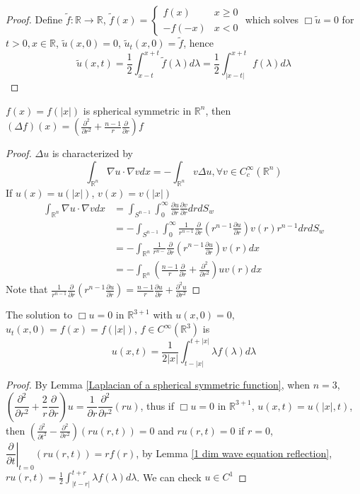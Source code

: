 \documentclass[main]{subfiles}
\begin{document}
\begin{proof}
Define $\tilde f:\mathbb R\to\mathbb R$, $\tilde f(x)=\begin{cases}
f(x)&x\geq0 \\
-f(-x) &x<0
\end{cases}$ which solves $\Box\tilde u=0$ for $t>0,x\in\mathbb R$, $\tilde u(x,0)=0$, $\tilde u_t(x,0)=\tilde f$, hence
\[\tilde u(x,t)=\frac{1}{2}\int_{x-t}^{x+t}\tilde f(\lambda)d\lambda=\frac{1}{2}\int_{|x-t|}^{x+t}f(\lambda)d\lambda\]
\end{proof}

\begin{lemma}\label{Laplacian of a spherical symmetric function}
$f(x)=f(|x|)$ is spherical symmetric in $\mathbb R^n$, then $\displaystyle(\Delta f)(x)=\left(\frac{\partial^2}{\partial r^2}+\frac{n-1}{r}\frac{\partial}{\partial r}\right)f$
\end{lemma}

\begin{proof}
$\Delta u$ is characterized by
\[\int_{\mathbb R^n}\nabla u\cdot\nabla vdx=-\int_{\mathbb R^n}v\Delta u, \forall v\in C^\infty_c(\mathbb R^n)\]
If $u(x)=u(|x|)$, $v(x)=v(|x|)$
\begin{align*}
\int_{\mathbb R^n}\nabla u\cdot\nabla vdx&=\int_{S^{n-1}}\int_0^\infty\frac{\partial u}{\partial r}\frac{\partial v}{\partial r}drdS_w \\
&=-\int_{S^{n-1}}\int_0^\infty\frac{1}{r^{n-1}}\frac{\partial}{\partial r}\left(r^{n-1}\frac{\partial u}{\partial r}\right)v(r)r^{n-1}drdS_w \\
&=-\int_{\mathbb R^n}\frac{1}{r^{n-}}\frac{\partial}{\partial r}\left(r^{n-1}\frac{\partial u}{\partial r}\right)v(r)dx \\
&=-\int_{\mathbb R^n}\left(\frac{n-1}{r}\frac{\partial }{\partial r}+\frac{\partial^2}{\partial r^2}\right)uv(r)dx
\end{align*}
Note that $\displaystyle\frac{1}{r^{n-1}}\frac{\partial}{\partial r}\left(r^{n-1}\frac{\partial u}{\partial r}\right)=\frac{n-1}{r}\frac{\partial u}{\partial r}+\frac{\partial^2u}{\partial r^2}$
\end{proof}

\begin{theorem}
The solution to $\Box u=0$ in $\mathbb R^{3+1}$ with $u(x,0)=0$, $u_t(x,0)=f(x)=f(|x|)$, $f\in C^\infty(\mathbb R^3)$ is
\[u(x,t)=\frac{1}{2|x|}\int_{t-|x|}^{t+|x|}\lambda f(\lambda)d\lambda\]
\end{theorem}

\begin{proof}
By Lemma \ref{Laplacian of a spherical symmetric function}, when $n=3$, $\left(\dfrac{\partial^2}{\partial r^2}+\dfrac{2}{r}\dfrac{\partial}{\partial r}\right)u=\dfrac{1}{\partial r}\dfrac{\partial^2}{\partial r^2}(ru)$, thus if $\Box u=0$ in $\mathbb R^{3+1}$, $u(x,t)=u(|x|,t)$, then $\displaystyle\left(\frac{\partial^2}{\partial t^2}-\frac{\partial^2}{\partial r^2}\right)(ru(r,t))=0$ and $ru(r,t)=0$ if $r=0$, $\left.\dfrac{\partial}{\partial t}\right|_{t=0}(ru(r,t))=rf(r)$, by Lemma \ref{1 dim wave equation reflection}, $\displaystyle ru(r,t)=\frac{1}{2}\int_{|t-r|}^{t+r}\lambda f(\lambda)d\lambda$. We can check $u\in C^1$
\end{proof}
\end{document}

